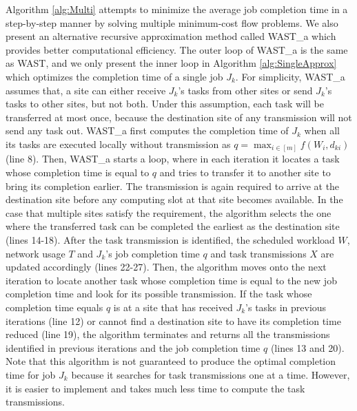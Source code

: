 Algorithm \ref{alg:Multi} attempts to minimize the average job completion time in a step-by-step manner by solving multiple minimum-cost flow problems. We also present an alternative recursive approximation method called WAST\_a which provides better computational efficiency. The outer loop of WAST\_a is the same as WAST, and we only present the inner loop in Algorithm \ref{alg:SingleApprox} which optimizes the completion time of a single job $J_k$. For simplicity, WAST\_a assumes that, a site can either receive $J_k$'s tasks from other sites or send $J_k$'s tasks to other sites, but not both. Under this assumption, each task will be transferred at most once, because the destination site of any transmission will not send any task out. WAST\_a first computes the completion time of $J_k$ when all its tasks are executed locally without transmission as $q = \max_{i\in[m]}f(W_i, d_{ki})$ (line 8). %
Then, WAST\_a starts a loop, where in each iteration it locates a task whose completion time is equal to $q$ and tries to transfer it to another site to bring its completion earlier. The transmission is again required to arrive at the destination site before any computing slot at that site becomes available. In the case that multiple sites satisfy the requirement, the algorithm selects the one where the transferred task can be completed the earliest as the destination site (lines 14-18). After the task transmission is identified, the scheduled workload $W$, network usage $T$ and $J_k$'s job completion time $q$ and task transmissions $X$ are updated accordingly (lines 22-27). Then, the algorithm moves onto the next iteration to locate another task whose completion time is equal to the new job completion time and look for its possible transmission. 
If the task whose completion time equals $q$ is at a site that has received $J_k$'s tasks in previous iterations (line 12) or cannot find a destination site to have its completion time reduced (line 19), the algorithm terminates and returns all the transmissions identified in previous iterations and the job completion time $q$ (lines 13 and 20). 
Note that 
this algorithm is not guaranteed to produce the optimal completion time for job $J_k$ because it searches for task transmissions one at a time. However, it is easier to implement and takes much less time to compute the task transmissions.%

